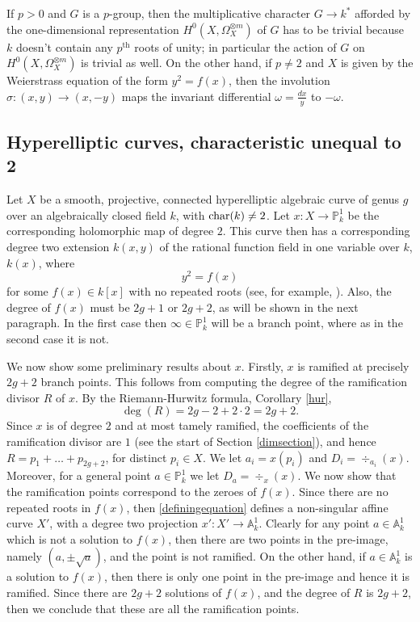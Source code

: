 If $p>0$ and $G$ is a $p$-group, then the multiplicative character $G\rightarrow k^*$ afforded by the one-dimensional representation $H^0(X,\Omega_X^{\otimes m})$ of $G$ has to be trivial because $k$ doesn't contain any $p^{\mbox{th}}$ roots of unity;
in particular the action of $G$ on $H^0(X,\Omega_X^{\otimes m})$ is trivial as well.
On the other hand, if $p\neq 2$ and $X$ is given by the Weierstrass equation of the form $y^2 = f(x)$, then the involution $\sigma : (x,y) \rightarrow (x,-y)$ maps the invariant differential $\omega = \frac{dx}{y}$ to $-\omega$.


\subsection{Hyperelliptic curves, characteristic unequal to 2}\label{charneq2}
Let $X$ be a smooth, projective, connected hyperelliptic algebraic curve of genus $g$ over an algebraically closed field $k$, with $\operatorname{char} (k) \neq 2$.
Let $x:X\rightarrow \mathbb{P}_k^1$ be the corresponding holomorphic map of degree $2$.
This curve then has a corresponding degree two extension $k(x,y)$ of the rational function field in one variable over $k$, $k(x)$, where
   \begin{equation}\label{definingequation}
   y^2 = f(x)
   \end{equation}
for some $f(x)\in k[x]$ with no repeated roots (see, for example, \cite[Rem. 7.4.25]{liu}).
Also, the degree of $f(x)$ must be $2g+1$ or $2g+2$, as will be shown in the next paragraph.
In the first case then $\infty \in \mathbb P_k^1$ will be a branch point, where as in the second case it is not.

We now show some preliminary results about $x$. 
Firstly, $x$ is ramified at precisely $2g + 2$ branch points.
This follows from computing the degree of the ramification divisor $R$ of $x$.
By the Riemann-Hurwitz formula, Corollary \ref{hur},
    \[ 
    \deg(R) = 2g -2 +2\cdot 2 = 2g + 2.
    \]
Since $x$ is of degree $2$ and at most tamely ramified, the coefficients of the ramification divisor are $1$ (see the start of Section \ref{dimsection}), and hence $R = p_1 + \ldots + p_{2g+2}$, for distinct $p_i\in X$.
We let $a_i = x(p_i)$ and $D_i = \div_{a_i}(x)$.
Moreover, for a general point $a \in \mathbb P_k^1$ we let $D_a = \div_x(x)$.
We now show that the ramification points correspond to the zeroes of $f(x)$.
Since there are no repeated roots in $f(x)$, then \eqref{definingequation} defines a non-singular affine curve $X'$, with a degree two projection $x': X'\rightarrow \mathbb A_k^1$.
Clearly for any point $a\in \mathbb A_k^1$ which is not a solution to $f(x)$, then there are two points in the pre-image, namely $(a,\pm \sqrt{a})$, and the point is not ramified.
On the other hand, if $a\in \mathbb A_k^1$ is a solution to $f(x)$, then there is only one point in the pre-image and hence it is ramified.
Since there are $2g+2$ solutions of $f(x)$, and the degree of $R$ is $2g+2$, then we conclude that these are all the ramification points.

